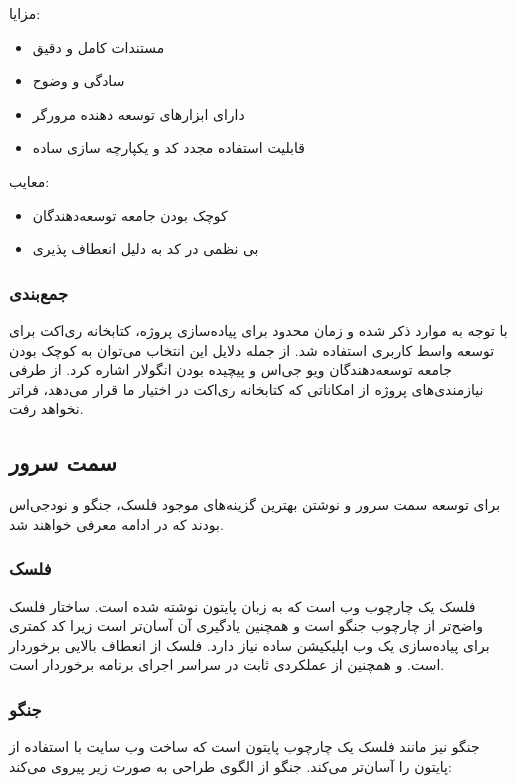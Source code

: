 مزایا:
\begin{itemize}
    \item مستندات کامل و دقیق
    \item سادگی و وضوح
    \item دارای ابزارهای توسعه دهنده مرورگر
    \item قابلیت استفاده مجدد کد و یکپارچه سازی ساده
\end{itemize}

معایب:

\begin{itemize}
    \item کوچک بودن جامعه توسعه‌دهندگان
    \item بی نظمی در کد به دلیل انعطاف پذیری 
\end{itemize}


\subsubsection{جمع‌بندی}

با توجه به موارد ذکر شده و زمان محدود برای پیاده‌سازی پروژه، کتابخانه ری‌اکت برای توسعه واسط کاربری استفاده شد. از جمله دلایل این انتخاب می‌توان به کوچک بودن جامعه توسعه‌دهندگان ویو جی‌اس و پیچیده بودن انگولار اشاره کرد. از طرفی نیازمندی‌های پروژه از امکاناتی که کتابخانه ری‌اکت در اختیار ما قرار می‌دهد، فراتر نخواهد رفت.


\subsection{سمت سرور}
برای توسعه سمت سرور و نوشتن  بهترین گزینه‌های موجود فلسک، جنگو و نودجی‌اس بودند که در ادامه معرفی خواهند شد.

\subsubsection{فلسک}
فلسک یک چارچوب وب است که به زبان پایتون نوشته شده است. ساختار فلسک واضح‌تر از چارچوب جنگو است و همچنین یادگیری آن آسان‌تر است زیرا کد کمتری برای پیاده‌سازی یک وب اپلیکیشن ساده نیاز دارد. فلسک از انعطاف بالایی برخوردار است. و همچنین از عملکردی ثابت در سراسر اجرای برنامه برخوردار است.

\subsubsection{جنگو }

جنگو نیز مانند فلسک یک چارچوب پایتون است که ساخت وب سایت با استفاده از پایتون را آسان‌تر می‌کند. جنگو از الگوی طراحی  به صورت زیر پیروی می‌کند:

